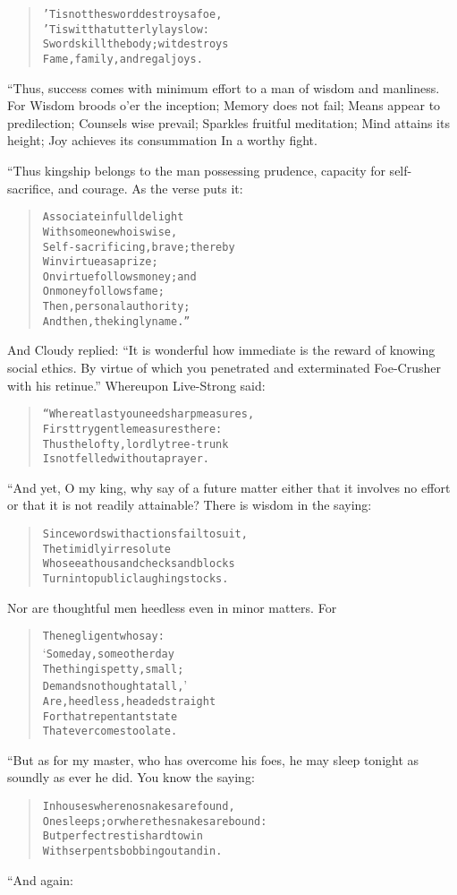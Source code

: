 \documentclass[article, twoside, 14pt]{memoir}
\renewenvironment{verbatim}{%
\begin{quote}%
\vskip -10pt%
\begin{alltt}\normalfont\large}{\end{alltt}%
\end{quote}%
\vskip -10pt
} %
\begin{document}
\begin{verbatim}
'Tis not the sword destroys a foe,
'Tis wit that utterly lays low:
Swords kill the body; wit destroys
Fame, family, and regal joys.
\end{verbatim}
“Thus, success comes with minimum effort to a man of wisdom and
manliness. For Wisdom broods o'er the inception; Memory does not
fail; Means appear to predilection; Counsels wise prevail; Sparkles
fruitful meditation; Mind attains its height; Joy achieves its
consummation In a worthy fight.

“Thus kingship belongs to the man possessing prudence, capacity for
self-sacrifice, and courage. As the verse puts it:

\begin{verbatim}
Associate in full delight
    With someone who is wise,
Self-sacrificing, brave; thereby
    Win virtue as a prize;
On virtue follows money; and
    On money follows fame;
Then, personal authority;
    And then, the kingly name.”
\end{verbatim}
And Cloudy replied:
``It is wonderful how immediate is the reward of knowing social ethics. By virtue of which you penetrated and exterminated Foe-Crusher with his retinue.''
Whereupon Live-Strong said:

\begin{verbatim}
“Where at last you need sharp measures,
    First try gentle measures there:
Thus the lofty, lordly tree-trunk
    Is not felled without a prayer.
\end{verbatim}
“And yet, O my king, why say of a future matter either that it
involves no effort or that it is not readily attainable? There is
wisdom in the saying:

\begin{verbatim}
Since words with actions fail to suit,
The timidly irresolute
Who see a thousand checks and blocks
Turn into public laughingstocks.
\end{verbatim}
Nor are thoughtful men heedless even in minor matters. For

\begin{verbatim}
The negligent who say:
‘Some day, some other day{\textemdash}
The thing is petty, small;
Demands no thought at all,’
Are, heedless, headed straight
For that repentant state
That ever comes too late.
\end{verbatim}
“But as for my master, who has overcome his foes, he may sleep
tonight as soundly as ever he did. You know the saying:

\begin{verbatim}
In houses where no snakes are found,
One sleeps; or where the snakes are bound:
But perfect rest is hard to win
With serpents bobbing out and in.
\end{verbatim}
“And again:
\end{document}
